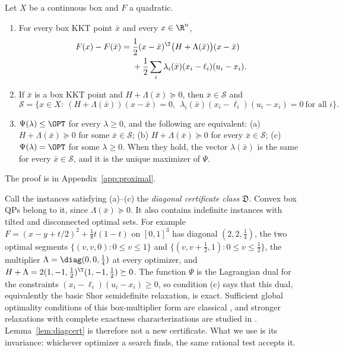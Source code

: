 \begin{lemma}\label{lem:diagcert}
Let $X$ be a continuous box and $F$ a quadratic.
\begin{enumerate}
\item[(i)] For every box KKT point $\bar x$ and every $x\in\R^n$,
\begin{equation}\label{eq:diagid}
\begin{split}
F(x)-F(\bar x)={}&\frac12(x-\bar x)^{\T}\bigl(H+\Lambda(\bar x)\bigr)(x-\bar x)\\
&+\frac12\sum_i\lambda_i(\bar x)(x_i-\ell_i)(u_i-x_i).
\end{split}
\end{equation}
\item[(ii)] If $\bar x$ is a box KKT point and $H+\Lambda(\bar x)\succeq0$,
then $\bar x\in\mathcal S$ and
\begin{equation}\label{eq:diagset}
\mathcal S=\bigl\{x\in X:\ (H+\Lambda(\bar x))(x-\bar x)=0,\ \
\lambda_i(\bar x)(x_i-\ell_i)(u_i-x_i)=0\ \text{for all }i\bigr\}.
\end{equation}
\item[(iii)] $\Psi(\lambda)\le\OPT$ for every $\lambda\ge0$, and the
following are equivalent: (a) $H+\Lambda(\bar x)\succeq0$ for some
$\bar x\in\mathcal S$; (b) $H+\Lambda(\bar x)\succeq0$ for every
$\bar x\in\mathcal S$; (c) $\Psi(\lambda)=\OPT$ for some $\lambda\ge0$. When
they hold, the vector $\lambda(\bar x)$ is the same for every
$\bar x\in\mathcal S$, and it is the unique maximizer of $\Psi$.
\end{enumerate}
The proof is in Appendix~\ref{app:proximal}.
\end{lemma}

\begin{remark}\label{rem:shor}
Call the instances satisfying (a)--(c) the \emph{diagonal certificate class}
$\mathfrak D$. Convex box QPs belong to it, since $\Lambda(\bar x)\succeq0$.
It also contains indefinite instances with tilted and disconnected optimal
sets. For example $F=(x-y+t/2)^2+\frac18t(1-t)$ on $[0,1]^3$ has diagonal
$(2,2,\frac14)$, the two optimal segments $\{(v,v,0):0\le v\le1\}$ and
$\{(v,v+\frac12,1):0\le v\le\frac12\}$, the multiplier
$\Lambda=\diag(0,0,\frac14)$ at every optimizer, and
$H+\Lambda=2(1,-1,\tfrac12)^{\T}(1,-1,\tfrac12)\succeq0$. The function
$\Psi$ is the Lagrangian dual for the constraints
$(x_i-\ell_i)(u_i-x_i)\ge0$, so condition (c) says that this dual,
equivalently the basic Shor semidefinite relaxation, is exact. Sufficient
global optimality conditions of this box-multiplier form are classical
\cite{JeyakumarRubinovWu2006,LiWuQuan2015}, and stronger relaxations with
complete exactness characterizations are studied in \cite{QiuYildirim2024}.
Lemma~\ref{lem:diagcert} is therefore not a new certificate. What we use is
its invariance: whichever optimizer a search finds, the same rational test
accepts it.
\end{remark}


